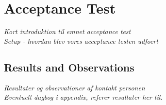 \section{Acceptance Test}
\textit{Kort introduktion til emnet acceptance test\\
Setup - hvordan blev vores acceptance testen udfoert}

\subsection{Results and Observations}
\textit{Resultater og observationer af kontakt personen\\
Eventuelt dagbog i appendix, referer resultater her til.}